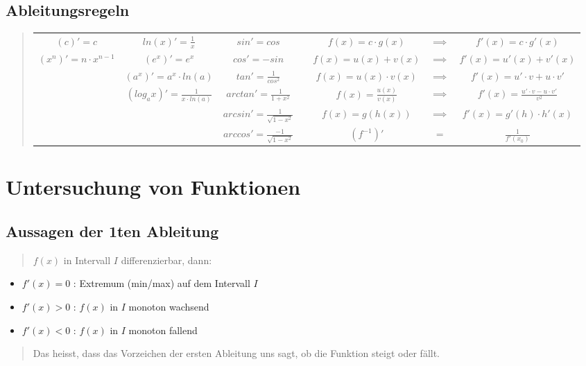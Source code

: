 \subsection*{Ableitungsregeln}
\begin{quote}
\begin{tabular}{|c|c|c|c|c|c|c|}
\cline{1-3} \cline{5-7} 
$(c)'=c$ & $ln(x)'=\frac{1}{x}$ & $sin'=cos$ &  & $f(x)=c\cdot g(x)$ & $\implies$ & $f'(x)=c\cdot g'(x)$\tabularnewline
\cline{1-3} \cline{5-7} 
$(x^{n})'=n\cdot x^{n-1}$ & $(e^{x})'=e^{x}$ & $cos'=-sin$ &  & $f(x)=u(x)+v(x)$ & $\implies$ & $f'(x)=u'(x)+v'(x)$\tabularnewline
\cline{1-3} \cline{5-7} 
 & $(a^{x})'=a^{x}\cdot ln(a)$ & $tan'=\frac{1}{cos^{2}}$ &  & $f(x)=u(x)\cdot v(x)$ & $\implies$ & $f'(x)=u'\cdot v+u\cdot v'$\tabularnewline
\cline{2-3} \cline{5-7} 
 & $(log_{a}x)'=\frac{1}{x\cdot ln(a)}$ & $arctan'=\frac{1}{1+x^{2}}$ &  & $f(x)=\frac{u(x)}{v(x)}$ & $\implies$ & $f'(x)=\frac{u'\cdot v-u\cdot v'}{v^{2}}$\tabularnewline
\cline{3-3} \cline{5-7} 
 &  & $arcsin'=\frac{1}{\sqrt{1-x^{2}}}$ &  & $f(x)=g(h(x))$ & $\implies$ & $f'(x)=g'(h)\cdot h'(x)$\tabularnewline
\cline{3-3} \cline{5-7} 
 &  & $arccos'=\frac{-1}{\sqrt{1-x^{2}}}$ &  & $(f^{-1})'$ & $=$ & $\frac{1}{f'(x_{0})}$\tabularnewline
\end{tabular}
\end{quote}

\section*{Untersuchung von Funktionen}


\subsection*{Aussagen der 1ten Ableitung}
\begin{quote}
$f(x)$ in Intervall $I$ differenzierbar, dann:\end{quote}
\begin{itemize}
\item $f'(x)=0$ : Extremum (min/max) auf dem Intervall $I$
\item $f'(x)>0$ : $f(x)$ in $I$ monoton wachsend
\item $f'(x)<0$ : $f(x)$ in $I$ monoton fallend\end{itemize}
\begin{quote}
Das heisst, dass das Vorzeichen der ersten Ableitung uns sagt, ob
die Funktion steigt oder fällt.
\end{quote}

